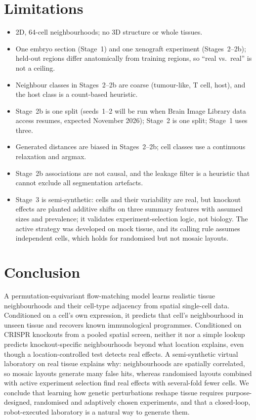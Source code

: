 \documentclass[journal]{IEEEtran}
\begin{document}
\section{Limitations}
\begin{itemize}
  \item 2D, 64-cell neighbourhoods; no 3D structure or whole tissues.
  \item One embryo section (Stage~1) and one xenograft experiment (Stages~2--2b); held-out regions differ anatomically from training regions, so ``real vs.\ real'' is not a ceiling.
  \item Neighbour classes in Stages~2--2b are coarse (tumour-like, T cell, host), and the host class is a count-based heuristic.
  \item Stage~2b is one split (seeds~1--2 will be run when Brain Image Library data access resumes, expected November 2026); Stage~2 is one split; Stage~1 uses three.
  \item Generated distances are biased in Stages~2--2b; cell classes use a continuous relaxation and argmax.
  \item Stage~2b associations are not causal, and the leakage filter is a heuristic that cannot exclude all segmentation artefacts.
  \item Stage~3 is semi-synthetic: cells and their variability are real, but knockout effects are planted additive shifts on three summary features with assumed sizes and prevalence; it validates experiment-selection logic, not biology. The active strategy was developed on mock tissue, and its calling rule assumes independent cells, which holds for randomised but not mosaic layouts.
\end{itemize}

\section{Conclusion}
A permutation-equivariant flow-matching model learns realistic tissue neighbourhoods and their cell-type adjacency from spatial single-cell data. Conditioned on a cell's own expression, it predicts that cell's neighbourhood in unseen tissue and recovers known immunological programmes. Conditioned on CRISPR knockouts from a pooled spatial screen, neither it nor a simple lookup predicts knockout-specific neighbourhoods beyond what location explains, even though a location-controlled test detects real effects. A semi-synthetic virtual laboratory on real tissue explains why: neighbourhoods are spatially correlated, so mosaic layouts generate many false hits, whereas randomised layouts combined with active experiment selection find real effects with several-fold fewer cells. We conclude that learning how genetic perturbations reshape tissue requires purpose-designed, randomised and adaptively chosen experiments, and that a closed-loop, robot-executed laboratory is a natural way to generate them.
\end{document}
